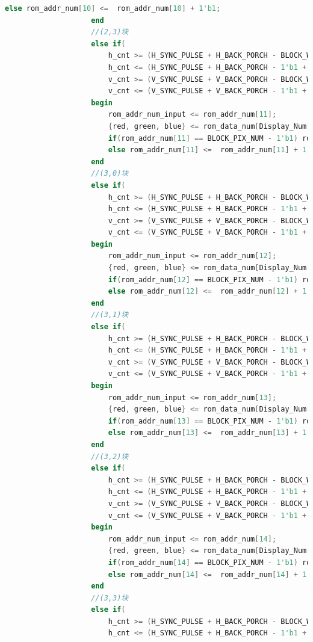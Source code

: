 \documentclass[UTF8]{article}
\begin{document}
\begin{lstlisting}[language=Verilog]
						else rom_addr_num[10] <=  rom_addr_num[10] + 1'b1;
					end
					//(2,3)块
					else if(
						h_cnt >= (H_SYNC_PULSE + H_BACK_PORCH - BLOCK_WIDTH + FRAME_START_H_4) &&
						h_cnt <= (H_SYNC_PULSE + H_BACK_PORCH - 1'b1 + FRAME_START_H_4)  && 
						v_cnt >= (V_SYNC_PULSE + V_BACK_PORCH - BLOCK_WIDTH + FRAME_START_V_3) &&
						v_cnt <= (V_SYNC_PULSE + V_BACK_PORCH - 1'b1 + FRAME_START_V_3))
					begin
						rom_addr_num_input <= rom_addr_num[11];
						{red, green, blue} <= rom_data_num[Display_Num[47:44]];
						if(rom_addr_num[11] == BLOCK_PIX_NUM - 1'b1) rom_addr_num[11] <=  13'd0;
						else rom_addr_num[11] <=  rom_addr_num[11] + 1'b1;
					end
					//(3,0)块
					else if(
						h_cnt >= (H_SYNC_PULSE + H_BACK_PORCH - BLOCK_WIDTH + FRAME_START_H_1) &&
						h_cnt <= (H_SYNC_PULSE + H_BACK_PORCH - 1'b1 + FRAME_START_H_1) && 
						v_cnt >= (V_SYNC_PULSE + V_BACK_PORCH - BLOCK_WIDTH + FRAME_START_V_4) &&
						v_cnt <= (V_SYNC_PULSE + V_BACK_PORCH - 1'b1 + FRAME_START_V_4))
					begin
						rom_addr_num_input <= rom_addr_num[12];
						{red, green, blue} <= rom_data_num[Display_Num[51:48]];
						if(rom_addr_num[12] == BLOCK_PIX_NUM - 1'b1) rom_addr_num[12] <=  13'd0;
						else rom_addr_num[12] <=  rom_addr_num[12] + 1'b1;
					end
					//(3,1)块
					else if(
						h_cnt >= (H_SYNC_PULSE + H_BACK_PORCH - BLOCK_WIDTH + FRAME_START_H_2) &&
						h_cnt <= (H_SYNC_PULSE + H_BACK_PORCH - 1'b1 + FRAME_START_H_2)  && 
						v_cnt >= (V_SYNC_PULSE + V_BACK_PORCH - BLOCK_WIDTH + FRAME_START_V_4) &&
						v_cnt <= (V_SYNC_PULSE + V_BACK_PORCH - 1'b1 + FRAME_START_V_4))
					begin
						rom_addr_num_input <= rom_addr_num[13];
						{red, green, blue} <= rom_data_num[Display_Num[55:52]];
						if(rom_addr_num[13] == BLOCK_PIX_NUM - 1'b1) rom_addr_num[13] <=  13'd0;
						else rom_addr_num[13] <=  rom_addr_num[13] + 1'b1;
					end
					//(3,2)块
					else if(
						h_cnt >= (H_SYNC_PULSE + H_BACK_PORCH - BLOCK_WIDTH + FRAME_START_H_3) &&
						h_cnt <= (H_SYNC_PULSE + H_BACK_PORCH - 1'b1 + FRAME_START_H_3)  && 
						v_cnt >= (V_SYNC_PULSE + V_BACK_PORCH - BLOCK_WIDTH + FRAME_START_V_4) &&
						v_cnt <= (V_SYNC_PULSE + V_BACK_PORCH - 1'b1 + FRAME_START_V_4))
					begin
						rom_addr_num_input <= rom_addr_num[14];
						{red, green, blue} <= rom_data_num[Display_Num[59:56]];
						if(rom_addr_num[14] == BLOCK_PIX_NUM - 1'b1) rom_addr_num[14] <=  13'd0;
						else rom_addr_num[14] <=  rom_addr_num[14] + 1'b1;
					end
					//(3,3)块
					else if(
						h_cnt >= (H_SYNC_PULSE + H_BACK_PORCH - BLOCK_WIDTH + FRAME_START_H_4) &&
						h_cnt <= (H_SYNC_PULSE + H_BACK_PORCH - 1'b1 + FRAME_START_H_4)  && 

\end{lstlisting}
\end{document}
